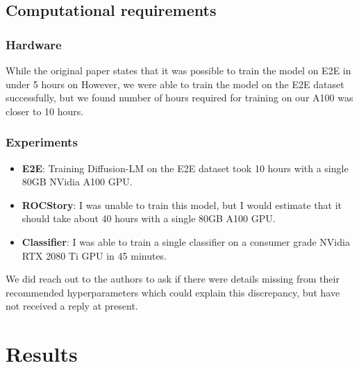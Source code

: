 \subsection{Computational requirements}

\subsubsection{Hardware}

While the original paper states that it was possible to train the model on E2E in under 5 hours on  However, we were able to train the model on the E2E dataset successfully, but we found number of hours required for training on our A100 was closer to 10 hours.

\subsubsection{Experiments}

\begin{itemize}
\item \textbf{E2E}: Training Diffusion-LM on the E2E dataset took 10 hours with a single 80GB NVidia A100 GPU.
\item \textbf{ROCStory}: I was unable to train this model, but I would estimate that it should take about 40 hours with a single 80GB A100 GPU.
\item \textbf{Classifier}: I was able to train a single classifier on a consumer grade NVidia RTX 2080 Ti GPU in 45 minutes.
\end{itemize}

We did reach out to the authors to ask if there were details missing from their recommended hyperparameters which could explain this discrepancy, but have not received a reply at present.

\section{Results}
\label{sec:results}

